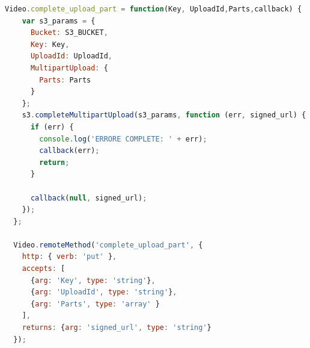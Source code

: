 \begin{enumerate}
\begin{lstlisting}[language=javascript]
Video.complete_upload_part = function(Key, UploadId,Parts,callback) {
    var s3_params = {
      Bucket: S3_BUCKET,
      Key: Key,
      UploadId: UploadId,
      MultipartUpload: {
        Parts: Parts
      } 
    };
    s3.completeMultipartUpload(s3_params, function (err, signed_url) {
      if (err) {
        console.log('ERRORE COMPLETE: ' + err);
        callback(err);
        return;
      }

      callback(null, signed_url);
    });
  };

  Video.remoteMethod('complete_upload_part', {
    http: { verb: 'put' },
    accepts: [
      {arg: 'Key', type: 'string'},
      {arg: 'UploadId', type: 'string'},
      {arg: 'Parts', type: 'array' }
    ],
    returns: {arg: 'signed_url', type: 'string'}
  });
\end{lstlisting}

\end{enumerate}

